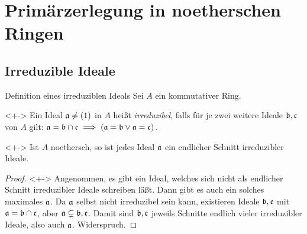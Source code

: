 \section{Primärzerlegung in noetherschen Ringen}

\subsection{Irreduzible Ideale}

\begin{frame}{Definition eines irreduziblen Ideals}
	Sei \(A\) ein kommutativer Ring.
	\begin{definition}<+->
		Ein Ideal \(\mathfrak{a} \neq (1)\) in \(A\) heißt \emph{irreduzibel}, falls
		für je zwei weitere Ideale \(\mathfrak{b}, \mathfrak{c}\) von \(A\) gilt:
		\(\mathfrak{a} = \mathfrak{b} \cap \mathfrak{c} \implies (\mathfrak{a} = \mathfrak{b}
		\lor \mathfrak{a} = \mathfrak{c})\).
	\end{definition}
	\begin{lemma}<+->
		\label{lem:lasker1}
		Ist \(A\) noethersch, so ist jedes Ideal \(\mathfrak{a}\) ein endlicher Schnitt
		irreduzibler Ideale.
	\end{lemma}
	\begin{proof}<+->
		Angenommen, es gibt ein Ideal, welches sich nicht als endlicher Schnitt
		irreduzibler Ideale schreiben läßt. Dann gibt es auch ein solches
		maximales \(\mathfrak{a}\). Da \(\mathfrak{a}\) selbst nicht irreduzibel sein kann,
		existieren Ideale \(\mathfrak{b}, \mathfrak{c}\) mit \(\mathfrak{a} = \mathfrak{b} \cap \mathfrak{c}\),
		aber \(\mathfrak{a} \subsetneq \mathfrak{b}, \mathfrak{c}\). Damit sind \(\mathfrak{b}, \mathfrak{c}\)
		jeweils Schnitte endlich vieler irreduzibler Ideale, also auch \(\mathfrak{a}\).
		Widerspruch.
	\end{proof}
\end{frame}

